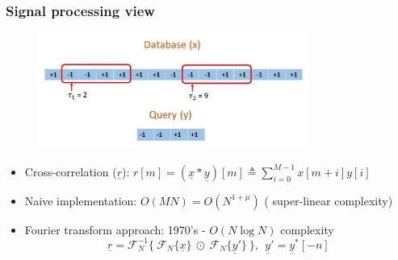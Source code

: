 \documentclass[10pt,xcolor=table]{beamer}
\newcommand{\defeq}{\triangleq}
\newcommand{\xv}{\underline{x}}
\newcommand{\yv}{\underline{y}}
\newcommand{\rv}{\underline{r}}
\begin{document}
\begin{frame}\frametitle{Signal processing view}

	\begin{figure}[t]
		\centering
		\includegraphics[width=3.5in]{Pattern_matching_ex.pdf}
	\end{figure}

			\begin{block}{}			
				\begin{itemize}
					\item {Cross-correlation} ($\rv$): $\displaystyle{r[m]=(\xv*\yv)[m] \defeq \sum_{i=0}^{M-1} x[m+i] y[i] }$
			        \pause
					\item {Naive implementation}: $O(MN) = O(N^{1+\mu})$ ({\color{blue} super-linear} complexity)
                    \pause
					\item {Fourier transform approach}: 1970's - $O(N \log N)$ complexity
					\begin{equation}\nonumber
					\rv = \mathcal{F}_{N}^{-1} \{~  \mathcal{F}_{N}\{\xv\} ~ \odot ~  \mathcal{F}_{N}\{\yv'\} ~ \}, \ \ \yv' = \yv^{*}[-n]
					\end{equation}
					
				\end{itemize}
			\end{block}												
\end{frame}
\end{document}
